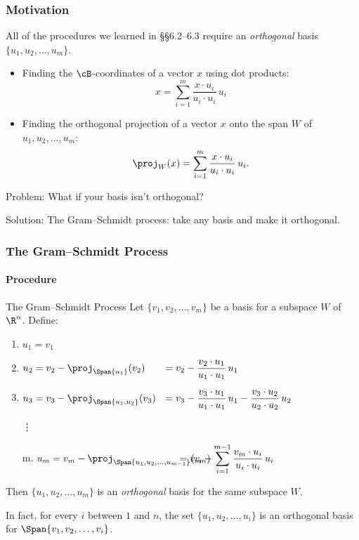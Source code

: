 



\begin{frame}
\frametitle{Motivation}

All of the procedures we learned in \S\S6.2--6.3 require an \emph{orthogonal}
basis $\{u_1,u_2,\ldots,u_m\}$.
\pause
\begin{itemize}
\item Finding the $\cB$-coordinates of a vector $x$ using dot products:
  \[ x = \sum_{i=1}^m \frac{x\cdot u_i}{u_i\cdot u_i}\,u_i \]
\pause
\item Finding the orthogonal projection of a vector $x$ onto the span $W$ of
  $u_1,u_2,\ldots,u_m$:
  \[ \proj_W(x) = \sum_{i=1}^m \frac{x\cdot u_i}{u_i\cdot u_i}\,u_i. \]
\end{itemize}

\pause\medskip
\alert{Problem:} What if your basis isn't orthogonal?

\pause\medskip
\alert{Solution:} The Gram--Schmidt process: take any basis and make it
orthogonal.

\end{frame}



\begin{frame}
\frametitle{The Gram--Schmidt Process}
\framesubtitle{Procedure}

\vskip-3mm
\begin{oneoffthm}{The Gram--Schmidt Process}
  Let $\{v_1,v_2,\ldots,v_m\}$ be a basis for a subspace $W$ of $\R^n$.  Define:
  \begin{enumerate}
  \item $u_1 = v_1$
    \pause
  \item $\displaystyle 
    \hbox to 5cm{$u_2 = v_2 - \proj_{\Span\{u_1\}}(v_2)$\hss}
    = v_2 - \frac{v_2\cdot u_1}{u_1\cdot u_1}\,u_1$
    \pause
  \item $\displaystyle 
    \hbox to 5cm{$u_3 = v_3 -\proj_{\Span\{u_1,u_2\}}(v_3)$\hss}
    = v_3 - \frac{v_3\cdot u_1}{u_1\cdot u_1}\,u_1
    - \frac{v_3\cdot u_2}{u_2\cdot u_2}\,u_2$
    \pause
  \item[\vdots]
  \item[m.] $\displaystyle 
    \hbox to 5cm{$u_m = v_m -\proj_{\Span\{u_1,u_2,\ldots,u_{m-1}\}}(v_m)$\hss}
    = v_m - \sum_{i=1}^{m-1}\frac{v_m\cdot u_i}{u_i\cdot u_i}\,u_i$
  \end{enumerate}
  \pause
  Then $\{u_1,u_2,\ldots,u_m\}$ is an \emph{orthogonal} basis for the same
  subspace $W$.
\end{oneoffthm}

\pause\smallskip
\begin{rem}
  In fact, for every $i$ between $1$ and $n$, the set
  $\{u_1,u_2,\ldots,u_i\}$ is an orthogonal basis for 
  $\Span\{v_1,v_2,\ldots,v_i\}$.
\end{rem}

\end{frame}


